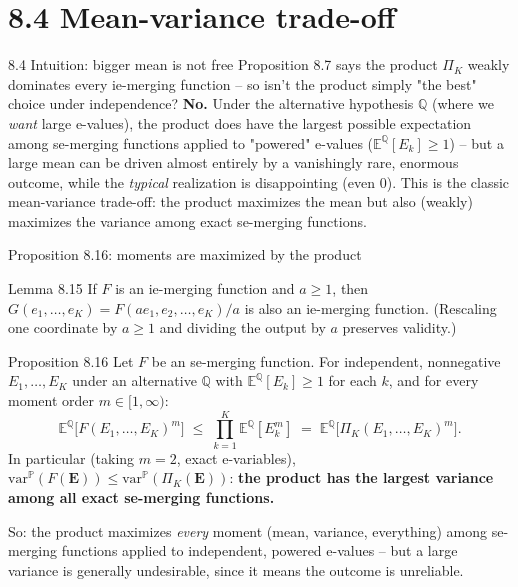 \documentclass[aspectratio=169,10pt]{beamer}
\newcommand{\E}{\mathbb{E}}
\newcommand{\Pb}{\mathbb{P}}
\newcommand{\Qb}{\mathbb{Q}}
\begin{document}
\section{8.4 Mean-variance trade-off}

\begin{frame}{8.4 Intuition: bigger mean is not free}
  Proposition 8.7 says the product $\Pi_K$ weakly dominates every ie-merging function -- so isn't the product simply "the best" choice under independence? \textbf{No.} Under the alternative hypothesis $\Qb$ (where we \emph{want} large e-values), the product does have the largest possible expectation among se-merging functions applied to "powered" e-values ($\E^{\Qb}[E_k]\geq 1$) -- but a large mean can be driven almost entirely by a vanishingly rare, enormous outcome, while the \emph{typical} realization is disappointing (even $0$). This is the classic mean-variance trade-off: the product maximizes the mean but also (weakly) maximizes the variance among exact se-merging functions.
\end{frame}

\begin{frame}{Proposition 8.16: moments are maximized by the product}
  \begin{block}{Lemma 8.15}
    If $F$ is an ie-merging function and $a \geq 1$, then $G(e_1,\dots,e_K) = F(ae_1,e_2,\dots,e_K)/a$ is also an ie-merging function. (Rescaling one coordinate by $a\geq1$ and dividing the output by $a$ preserves validity.)
  \end{block}
  \begin{block}{Proposition 8.16}
    Let $F$ be an se-merging function. For independent, nonnegative $E_1,\dots,E_K$ under an alternative $\Qb$ with $\E^{\Qb}[E_k]\geq 1$ for each $k$, and for every moment order $m \in [1,\infty)$:
    \[
      \E^{\Qb}\big[F(E_1,\dots,E_K)^m\big] \;\leq\; \prod_{k=1}^K \E^{\Qb}[E_k^m] \;=\; \E^{\Qb}\big[\Pi_K(E_1,\dots,E_K)^m\big].
    \]
    In particular (taking $m=2$, exact e-variables), $\mathrm{var}^{\Pb}(F(\mathbf E)) \leq \mathrm{var}^{\Pb}(\Pi_K(\mathbf E))$: \textbf{the product has the largest variance among all exact se-merging functions.}
  \end{block}
  So: the product maximizes \emph{every} moment (mean, variance, everything) among se-merging functions applied to independent, powered e-values -- but a large variance is generally undesirable, since it means the outcome is unreliable.
\end{frame}
\end{document}
